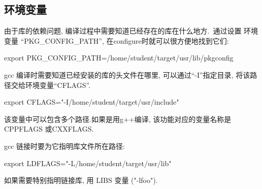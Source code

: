 \subsection{环境变量}
    由于库的依赖问题, 编译过程中需要知道已经存在的库在什么地方.~通过设置
环境变量 ``PKG\_CONFIG\_PATH'', 在configure时就可以很方便地找到它们:

    export PKG\_CONFIG\_PATH=/home/student/target/usr/lib/pkgconfig

    gcc 编译时需要知道已经安装的库的头文件在哪里, 可以通过``-I''指定目录,
将该路径交给环境变量``CFLAGS''.

    export CFLAGS="-I/home/student/target/usr/include"

    该变量中可以包含多个路径.如果是用g++编译, 该功能对应的变量名称是CPPFLAGS
或CXXFLAGS.

    gcc 链接时要为它指明库文件所在路径: 

    export LDFLAGS="-L/home/student/target/usr/lib"

    如果需要特别指明链接库, 用 LIBS 变量 ("-lfoo").
